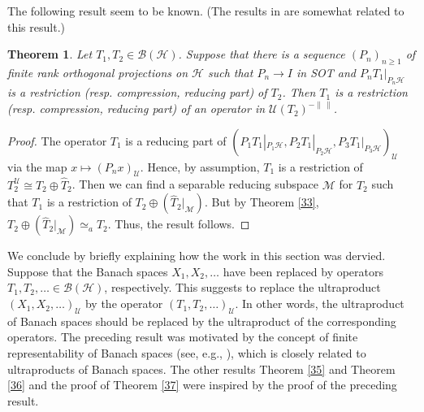 \documentclass[11pt]{amsart}
\newtheorem{theorem}{Theorem}[section]
\theoremstyle{definition}
\numberwithin{equation}{section}
\begin{document}
The following result seem to be known. (The results in \cite{Davidson} are somewhat related to this result.)
\begin{theorem}\label{310}
Let $T_{1},T_{2}\in\mathcal{B(H)}$. Suppose that there is a sequence $(P_{n})_{n\geq 1}$ of finite rank orthogonal projections on $\mathcal{H}$ such that $P_{n}\to I$ in
SOT and $P_{n}T_{1}|_{P_{n}\mathcal{H}}$ is a restriction (resp. compression, reducing part) of $T_{2}$. Then $T_{1}$ is a restriction (resp. compression,
reducing part) of an operator in $\mathcal{U}(T_{2})^{-\|\,\|}$.
\end{theorem}
\begin{proof}
The operator $T_{1}$ is a reducing part of $(P_{1}T_{1}|_{P_{1}\mathcal{H}},P_{2}T_{1}|_{P_{2}\mathcal{H}},P_{3}T_{1}|_{P_{3}\mathcal{H}})_{\mathscr{U}}$ via the map
$x\mapsto (P_{n}x)_{\mathscr{U}}$. Hence, by assumption, $T_{1}$ is a restriction of $T_{2}^{\mathscr{U}}\cong T_{2}\oplus\widehat{T}_{2}$. Then we can find a
separable reducing subspace $\mathcal{M}$ for $\widehat{T}_{2}$ such that $T_{1}$ is a restriction of $T_{2}\oplus(\widehat{T}_{2}|_{\mathcal{M}})$. But by Theorem
\ref{33}, $T_{2}\oplus(\widehat{T}_{2}|_{\mathcal{M}})\simeq_{a}T_{2}$. Thus, the result follows.
\end{proof}
We conclude by briefly explaining how the work in this section was dervied. Suppose that the Banach spaces $X_{1},X_{2},\ldots$ have been replaced by operators
$T_{1},T_{2},\ldots\in\mathcal{B(H)}$, respectively. This suggests to replace the ultraproduct $(X_{1},X_{2},\ldots)_{\mathscr{U}}$ by the operator $(T_{1},T_{2},\ldots)_{
\mathscr{U}}$. In other words, the ultraproduct of Banach spaces should be replaced by the ultraproduct of the corresponding operators. The preceding result was motivated by the
concept of finite representability of Banach spaces (see, e.g., \cite[Chapter 8]{Diestel}), which is closely related to ultraproducts of Banach spaces. The other results
Theorem \ref{35} and Theorem \ref{36} and the proof of Theorem \ref{37} were inspired by the proof of the preceding result.
\end{document}
